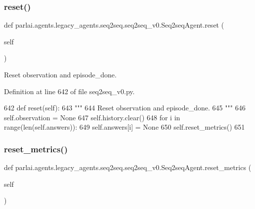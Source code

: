 \subsubsection{\texorpdfstring{reset()}{reset()}}
{\footnotesize\ttfamily def parlai.\+agents.\+legacy\+\_\+agents.\+seq2seq.\+seq2seq\+\_\+v0.\+Seq2seq\+Agent.\+reset (\begin{DoxyParamCaption}\item[{}]{self }\end{DoxyParamCaption})}

\begin{DoxyVerb}Reset observation and episode_done.
\end{DoxyVerb}
 

Definition at line 642 of file seq2seq\+\_\+v0.\+py.


\begin{DoxyCode}
642     \textcolor{keyword}{def }reset(self):
643         \textcolor{stringliteral}{"""}
644 \textcolor{stringliteral}{        Reset observation and episode\_done.}
645 \textcolor{stringliteral}{        """}
646         self.observation = \textcolor{keywordtype}{None}
647         self.history.clear()
648         \textcolor{keywordflow}{for} i \textcolor{keywordflow}{in} range(len(self.answers)):
649             self.answers[i] = \textcolor{keywordtype}{None}
650         self.reset\_metrics()
651 
\end{DoxyCode}
\mbox{\label{classparlai_1_1agents_1_1legacy__agents_1_1seq2seq_1_1seq2seq__v0_1_1Seq2seqAgent_ae76435bf7acee9501188de47c0ba6991}} 
\subsubsection{\texorpdfstring{reset\+\_\+metrics()}{reset\_metrics()}}
{\footnotesize\ttfamily def parlai.\+agents.\+legacy\+\_\+agents.\+seq2seq.\+seq2seq\+\_\+v0.\+Seq2seq\+Agent.\+reset\+\_\+metrics (\begin{DoxyParamCaption}\item[{}]{self }\end{DoxyParamCaption})}

